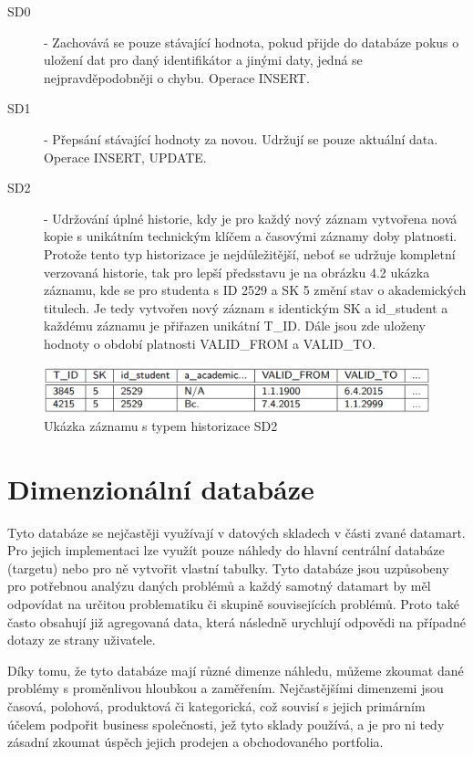 \documentclass[thesis=M,czech]{FITthesis}[2022/10/08]
\begin{document}
\begin{description}
    \item[SD0] - Zachovává se pouze stávající hodnota, pokud přijde do databáze pokus o uložení dat pro daný identifikátor a jinými daty, jedná se nejpravděpodobněji o chybu. Operace INSERT.
    \item[SD1] - Přepsání stávající hodnoty za novou. Udržují se pouze aktuální data. Operace INSERT, UPDATE.
    \item[SD2] - Udržování úplné historie, kdy je pro každý nový záznam vytvořena nová kopie s unikátním technickým klíčem a časovými záznamy doby platnosti. Protože tento typ historizace je nejdůležitější, neboť se udržuje kompletní verzovaná historie, tak pro lepší předsstavu je na obrázku 4.2 ukázka záznamu, kde se pro studenta s ID 2529 a SK 5 změní stav o akademických titulech. Je tedy vytvořen nový záznam s identickým SK a id\_student a každému záznamu je přiřazen unikátní T\_ID. Dále jsou zde uloženy hodnoty o období platnosti VALID\_FROM a VALID\_TO. 
\end{description}

\begin{figure}
    \centering
    \includegraphics[width=\textwidth]{DP-obrazky/SD2.png}
    \caption{Ukázka záznamu s typem historizace SD2 \cite{EDW3}}
    \label{fig:SD2}
\end{figure}


\section{Dimenzionální databáze}
Tyto databáze se nejčastěji využívají v datových skladech v části zvané datamart. Pro jejich implementaci lze využít pouze náhledy do hlavní centrální databáze (targetu) nebo pro ně vytvořit vlastní tabulky. Tyto databáze jsou uzpůsobeny pro potřebnou analýzu daných problémů a každý samotný datamart by měl odpovídat na určitou problematiku  či skupině souvisejících problémů. Proto také často obsahují již agregovaná data, která následně urychlují odpovědi na případné dotazy ze strany uživatele.

Díky tomu, že tyto databáze mají různé dimenze náhledu, můžeme zkoumat dané problémy s proměnlivou hloubkou a zaměřením. Nejčastějšími dimenzemi jsou časová, polohová, produktová či kategorická, což souvisí s jejich primárním účelem podpořit business společnosti, jež tyto sklady používá, a je pro ni tedy zásadní zkoumat úspěch jejich prodejen a obchodovaného portfolia. 
\end{document}

